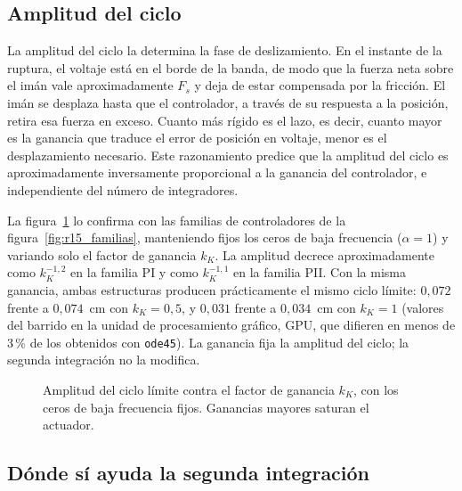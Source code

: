 \subsection{Amplitud del ciclo}

La amplitud del ciclo la determina la fase de deslizamiento. En el instante de la ruptura, el voltaje está en el borde de la banda, de modo que la fuerza neta sobre el imán vale aproximadamente $F_s$ y deja de estar compensada por la fricción. El imán se desplaza hasta que el controlador, a través de su respuesta a la posición, retira esa fuerza en exceso. Cuanto más rígido es el lazo, es decir, cuanto mayor es la ganancia que traduce el error de posición en voltaje, menor es el desplazamiento necesario. Este razonamiento predice que la amplitud del ciclo es aproximadamente inversamente proporcional a la ganancia del controlador, e independiente del número de integradores.

La figura~\ref{fig:ganancia} lo confirma con las familias de controladores de la figura~\ref{fig:r15_familias}, manteniendo fijos los ceros de baja frecuencia ($\alpha=1$) y variando solo el factor de ganancia $k_K$. La amplitud decrece aproximadamente como $k_K^{-1{,}2}$ en la familia PI y como $k_K^{-1{,}1}$ en la familia PII. Con la misma ganancia, ambas estructuras producen prácticamente el mismo ciclo límite: $0{,}072$ frente a $0{,}074$~cm con $k_K=0{,}5$, y $0{,}031$ frente a $0{,}034$~cm con $k_K=1$ (valores del barrido en la unidad de procesamiento gráfico, GPU, que difieren en menos de 3\,\% de los obtenidos con \texttt{ode45}). La ganancia fija la amplitud del ciclo; la segunda integración no la modifica.

\begin{figure}[ht]
    \centering
    
    \caption[Ciclo límite contra la ganancia]{Amplitud del ciclo límite contra el factor de ganancia $k_K$, con los ceros de baja frecuencia fijos. Ganancias mayores saturan el actuador.}
    \label{fig:ganancia}
\end{figure}

\subsection{Dónde sí ayuda la segunda integración}

